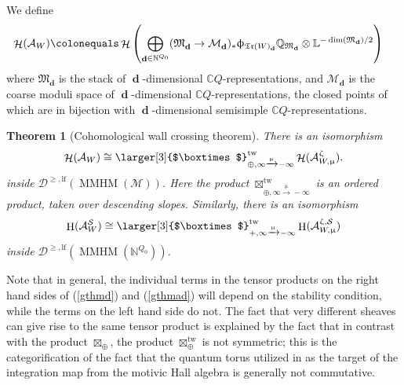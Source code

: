 \documentclass[a4paper,10pt]{amsart}
\renewcommand{\zeta}{\upzeta}
\renewcommand{\phi}{\upphi}
\renewcommand{\mu}{\upmu}
\newtheorem{thmx}{Theorem}
\newcommand{\Boxtimes}{\mbox{\larger[3]{$\boxtimes$}}}
\newcommand{\LL}{\mathbb{L}}
\newcommand{\QQ}{\mathbb{Q}}
\newcommand{\SP}{\mathcal{S}}
\newcommand{\WWW}{\mathfrak{Tr}(W)}
\newcommand{\Mst}{\mathfrak{M}}
\newcommand{\Msp}{\mathcal{M}}
\DeclareMathOperator{\tw}{tw}
\DeclareMathOperator{\MMHM}{MMHM}
\DeclareMathOperator{\dd}{\mathbf{d}}
\DeclareMathOperator{\Ho}{\mathcal{H}}
\DeclareMathOperator{\HO}{H}
\newcommand{\Dulf}{\mathcal{D}^{\geq, \mathrm{lf}}}
\begin{document}
  \smallbreak
  We define
\begin{align}
\label{relCA}
\Ho(\mathcal{A}_W)\colonequals &\Ho\left(\bigoplus_{\dd\in\mathbb{N}^{Q_0}}(\Mst_{\dd}\rightarrow\Msp_{\dd})_*\phi_{\WWW_{\dd}}\QQ_{\Mst_{\dd}}\otimes\LL^{-\dim(\Mst_{\dd})/2}\right)
\end{align}
where $\Mst_{\dd}$ is the stack of $\dd$-dimensional $\mathbb{C}Q$-representations, and $\Msp_{\dd}$ is the coarse moduli space of $\dd$-dimensional $\mathbb{C}Q$-representations, the closed points of which are in bijection with $\dd$-dimensional semisimple $\mathbb{C}Q$-representations.  
\begin{thmx}[Cohomological wall crossing theorem]
\label{CWCT}
There is an isomorphism
\begin{equation}
\label{gthmd}
\Ho(\mathcal{A}_W)\cong\Boxtimes_{\oplus, \infty\xrightarrow{\mu} -\infty}^{\tw} \Ho(\mathcal{A}_{W,\mu}^{\zeta}).
\end{equation}
inside $\Dulf(\MMHM(\Msp))$.  Here the product $\boxtimes_{\oplus,\infty \xrightarrow{\mu}-\infty}^{\tw}$ is an ordered product, taken over descending slopes.  Similarly, there is an isomorphism
\begin{equation}\label{gthmad}
\HO(\mathcal{A}^{\SP}_W)\cong \Boxtimes_{+,\infty \xrightarrow{\mu}-\infty}^{\tw} \HO(\mathcal{A}^{\zeta,\SP}_{W,\mu})
\end{equation}
inside $\Dulf(\MMHM(\mathbb{N}^{Q_0}))$.
\end{thmx}
Note that in general, the individual terms in the tensor products on the right hand sides of (\ref{gthmd}) and (\ref{gthmad}) will depend on the stability condition, while the terms on the left hand side do not.  The fact that very different sheaves can give rise to the same tensor product is explained by the fact that in contrast with the product $\boxtimes_{\oplus}$, the product $\boxtimes^{\tw}_{\oplus}$ is not symmetric; this is the categorification of the fact that the quantum torus utilized in \cite{KS1} as the target of the integration map from the motivic Hall algebra is generally not commutative.

\end{document}
